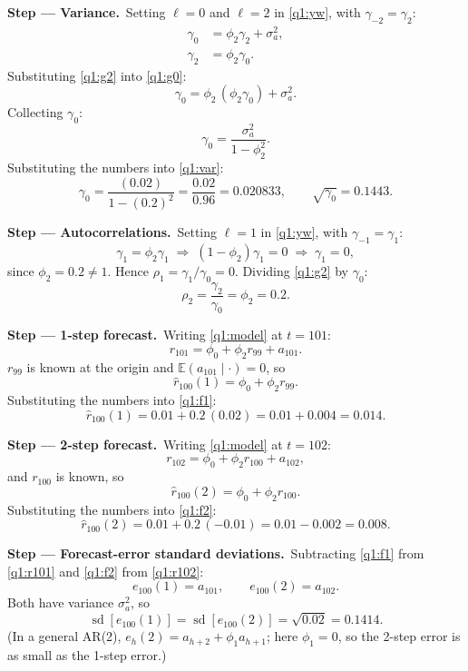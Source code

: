 \documentclass[11pt,a4paper]{article}
\numberwithin{equation}{questao}   %
\newcommand{\passo}[2]{\par\smallskip\noindent\textbf{Step --- #1.}~#2}
\newcommand{\E}{\mathbb{E}}
\begin{document}
\begin{sol}
\passo{Variance}{Setting $\ell=0$ and $\ell=2$ in \eqref{q1:yw}, with $\gamma_{-2}=\gamma_2$:}
\begin{align}
\gamma_0&=\phi_2\gamma_2+\sigma_a^2, \label{q1:g0}\\
\gamma_2&=\phi_2\gamma_0. \label{q1:g2}
\end{align}
Substituting \eqref{q1:g2} into \eqref{q1:g0}:
\[
\gamma_0=\phi_2\,(\phi_2\gamma_0)+\sigma_a^2 .
\]
Collecting $\gamma_0$:
\begin{equation}\label{q1:var}
\gamma_0=\frac{\sigma_a^2}{1-\phi_2^2}.
\end{equation}
Substituting the numbers into \eqref{q1:var}:
\[
\gamma_0=\frac{(0.02)}{1-(0.2)^2}=\frac{0.02}{0.96}=0.020833,
\qquad \sqrt{\gamma_0}=0.1443 .
\]

\passo{Autocorrelations}{Setting $\ell=1$ in \eqref{q1:yw}, with $\gamma_{-1}=\gamma_1$:}
\begin{equation}\label{q1:g1}
\gamma_1=\phi_2\gamma_1 \;\Longrightarrow\; (1-\phi_2)\gamma_1=0 \;\Longrightarrow\; \gamma_1=0,
\end{equation}
since $\phi_2=0.2\neq1$. Hence $\rho_1=\gamma_1/\gamma_0=0$. Dividing \eqref{q1:g2} by $\gamma_0$:
\[
\rho_2=\frac{\gamma_2}{\gamma_0}=\phi_2=0.2 .
\]

\passo{1-step forecast}{Writing \eqref{q1:model} at $t=101$:}
\begin{equation}\label{q1:r101}
r_{101}=\phi_0+\phi_2 r_{99}+a_{101}.
\end{equation}
$r_{99}$ is known at the origin and $\E(a_{101}\mid\cdot)=0$, so
\begin{equation}\label{q1:f1}
\hat r_{100}(1)=\phi_0+\phi_2 r_{99}.
\end{equation}
Substituting the numbers into \eqref{q1:f1}:
\[
\hat r_{100}(1)=0.01+0.2\,(0.02)=0.01+0.004=0.014 .
\]

\passo{2-step forecast}{Writing \eqref{q1:model} at $t=102$:}
\begin{equation}\label{q1:r102}
r_{102}=\phi_0+\phi_2 r_{100}+a_{102},
\end{equation}
and $r_{100}$ is known, so
\begin{equation}\label{q1:f2}
\hat r_{100}(2)=\phi_0+\phi_2 r_{100}.
\end{equation}
Substituting the numbers into \eqref{q1:f2}:
\[
\hat r_{100}(2)=0.01+0.2\,(-0.01)=0.01-0.002=0.008 .
\]

\passo{Forecast-error standard deviations}{Subtracting \eqref{q1:f1} from \eqref{q1:r101} and
\eqref{q1:f2} from \eqref{q1:r102}:}
\begin{equation}\label{q1:err}
e_{100}(1)=a_{101},\qquad e_{100}(2)=a_{102}.
\end{equation}
Both have variance $\sigma_a^2$, so
\[
\operatorname{sd}[e_{100}(1)]=\operatorname{sd}[e_{100}(2)]=\sqrt{0.02}=0.1414 .
\]
(In a general AR(2), $e_h(2)=a_{h+2}+\phi_1a_{h+1}$; here $\phi_1=0$, so the 2-step error is as small as
the 1-step error.)


\end{sol}
\end{document}

